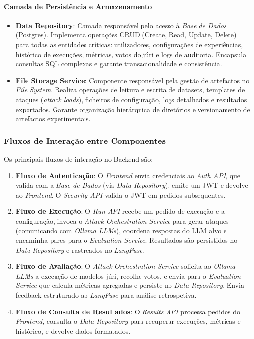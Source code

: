 \paragraph{Camada de Persistência e Armazenamento}

\begin{itemize}
\item \textbf{Data Repository}: Camada responsável pelo acesso à \textit{Base de Dados} (Postgres). Implementa operações CRUD (Create, Read, Update, Delete) para todas as entidades críticas: utilizadores, configurações de experiências, histórico de execuções, métricas, votos do júri e logs de auditoria. Encapsula consultas SQL complexas e garante transacionalidade e consistência.
\item \textbf{File Storage Service}: Componente responsável pela gestão de artefactos no \textit{File System}. Realiza operações de leitura e escrita de datasets, templates de ataques (\textit{attack loads}), ficheiros de configuração, logs detalhados e resultados exportados. Garante organização hierárquica de diretórios e versionamento de artefactos experimentais.
\end{itemize}

\subsubsection{Fluxos de Interação entre Componentes}

Os principais fluxos de interação no Backend são:

\begin{enumerate}
\item \textbf{Fluxo de Autenticação}: 
O \textit{Frontend} envia credenciais ao \textit{Auth API}, que valida com a \textit{Base de Dados} (via \textit{Data Repository}), emite um JWT e devolve ao \textit{Frontend}. O \textit{Security API} valida o JWT em pedidos subsequentes.

\item \textbf{Fluxo de Execução}: 
O \textit{Run API} recebe um pedido de execução e a configuração, invoca o \textit{Attack Orchestration Service} para gerar ataques (comunicando com \textit{Ollama LLMs}), coordena respostas do LLM alvo e encaminha pares para o \textit{Evaluation Service}. Resultados são persistidos no \textit{Data Repository} e rastreados no \textit{LangFuse}.

\item \textbf{Fluxo de Avaliação}: 
O \textit{Attack Orchestration Service} solicita ao \textit{Ollama LLMs} a execução de modelos júri, recolhe votos, e envia para o \textit{Evaluation Service} que calcula métricas agregadas e persiste no \textit{Data Repository}. Envia feedback estruturado ao \textit{LangFuse} para análise retrospetiva.

\item \textbf{Fluxo de Consulta de Resultados}: 
O \textit{Results API} processa pedidos do \textit{Frontend}, consulta o \textit{Data Repository} para recuperar execuções, métricas e histórico, e devolve dados formatados.
\end{enumerate}

